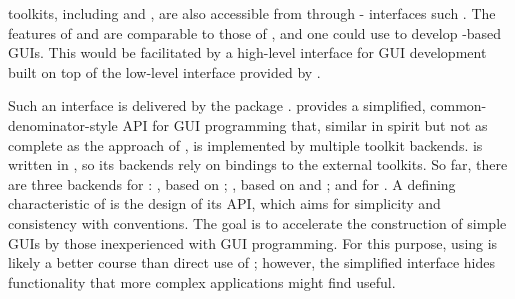\documentclass[article]{jss}
\begin{document}
 toolkits, including  and , are
also accessible
from  through - interfaces such
\citep{rJava}. The features
of  and  are comparable to those of ,
and one could use  to develop -based
GUIs. This would be facilitated by a high-level interface for GUI
development built on top of the low-level interface provided by
. 

Such an interface is delivered by the  package
\citep{gWidgets}.  provides a simplified,
common-denominator-style API for GUI programming that, similar in
spirit but not as complete as the approach of , is
implemented by multiple toolkit backends.  is written in
, so its backends rely on bindings to the external
toolkits. So far, there are three backends for :
, based on ; , based
on  and ; and  for
.  A defining characteristic of  is the
design of its API, which aims for simplicity and consistency with
 conventions.  The goal is to accelerate the construction
of simple GUIs by those inexperienced with GUI programming. For this
purpose, using  is likely a better course than direct
use of ; however, the simplified interface hides
functionality that more complex applications might find useful.

\end{document}
